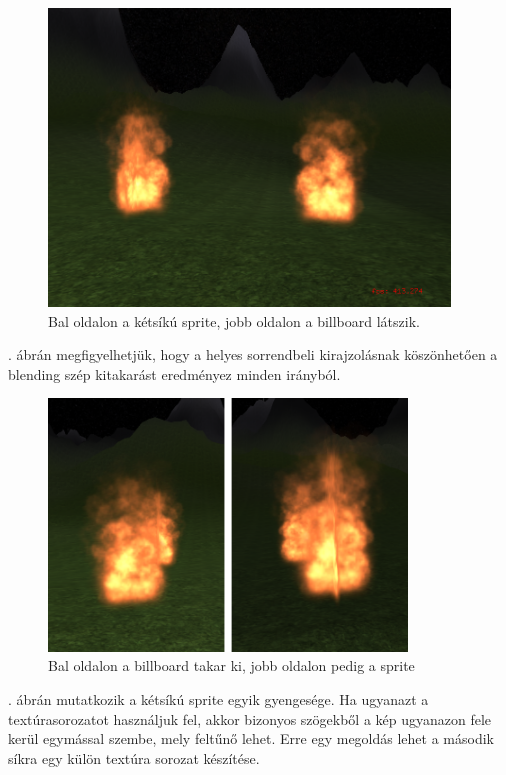 \begin{figure}[h!]
 \centering
 \includegraphics[width=0.95\textwidth]{kepek/billboardFinal1.png}
 \caption{Bal oldalon a kétsíkú sprite, jobb oldalon a billboard látszik.}
 \label{fig:billboardFinal1}
\end{figure}

. ábrán megfigyelhetjük, hogy a helyes sorrendbeli kirajzolásnak köszönhetően a blending szép kitakarást eredményez minden irányból.

\begin{figure}[h!]
 \centering
 \includegraphics[width=0.85\textwidth]{kepek/billboardFinal2.png}
 \caption{Bal oldalon a billboard takar ki, jobb oldalon pedig a sprite}
 \label{fig:billboardFinal2}
\end{figure}

. ábrán mutatkozik a kétsíkú sprite egyik gyengesége. Ha ugyanazt a textúrasorozatot használjuk fel, akkor bizonyos szögekből a kép ugyanazon fele kerül egymással szembe, mely feltűnő lehet. Erre egy megoldás lehet a második síkra egy külön textúra sorozat készítése.

